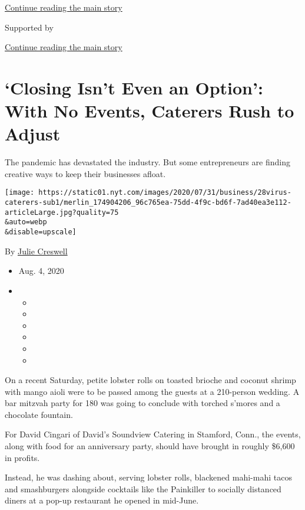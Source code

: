 \protect\hyperlink{after-top}{Continue reading the main story}

Supported by

\protect\hyperlink{after-sponsor}{Continue reading the main story}

\hypertarget{closing-isnt-even-an-option-with-no-events-caterers-rush-to-adjust}{%
\section{`Closing Isn't Even an Option': With No Events, Caterers Rush
to
Adjust}\label{closing-isnt-even-an-option-with-no-events-caterers-rush-to-adjust}}

The pandemic has devastated the industry. But some entrepreneurs are
finding creative ways to keep their businesses afloat.

\texttt{[image: https://static01.nyt.com/images/2020/07/31/business/28virus-caterers-sub1/merlin\_174904206\_96c765ea-75dd-4f9c-bd6f-7ad40ea3e112-articleLarge.jpg?quality=75\\\&auto=webp\\\&disable=upscale]}

By \href{https://www.nytimes.com/by/julie-creswell}{Julie Creswell}

\begin{itemize}
\item
  Aug. 4, 2020
\item
  \begin{itemize}
  \item
  \item
  \item
  \item
  \item
  \item
  \end{itemize}
\end{itemize}

On a recent Saturday, petite lobster rolls on toasted brioche and
coconut shrimp with mango aioli were to be passed among the guests at a
210-person wedding. A bar mitzvah party for 180 was going to conclude
with torched s'mores and a chocolate fountain.

For David Cingari of David's Soundview Catering in Stamford, Conn., the
events, along with food for an anniversary party, should have brought in
roughly \$6,600 in profits.

Instead, he was dashing about, serving lobster rolls, blackened
mahi-mahi tacos and smashburgers alongside cocktails like the Painkiller
to socially distanced diners at a pop-up restaurant he opened in
mid-June.

